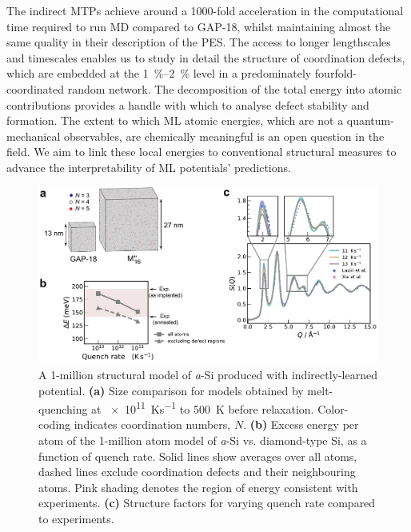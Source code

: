 \documentclass[12pt,a4paper,twoside,nobind]{ociamthesis}
\begin{document}
The indirect MTPs achieve around a 1000-fold acceleration in the computational time required to run MD compared to GAP-18, whilst maintaining almost the same quality in their description of the PES.
The access to longer lengthscales and timescales enables us to study in detail the structure of coordination defects,
which are embedded at the \SIrange{1}{2}{\%} level in a predominately fourfold-coordinated random network. The decomposition of the total energy into atomic contributions provides a handle with which 
to analyse defect stability and formation. The extent to which ML atomic energies, which are not a quantum-mechanical observables, are chemically meaningful is an open question in the field.
We aim to link these local energies to conventional structural measures to advance the interpretability of ML potentials' predictions. 

 \begin{figure}[ht]
  \centering
  \includegraphics[width=\linewidth]{rejig_fig1_tos.pdf}
  \caption{
  A 1-million structural model of \emph{a}-Si produced with indirectly-learned potential. \textbf{(a)} Size comparison for models
  obtained by melt-quenching at \SI{e11}{Ks^{-1}} to \SI{500}{K} before relaxation. Color-coding indicates coordination numbers, $N$. 
  \textbf{(b)} Excess energy per atom of the 1-million atom model of \emph{a}-Si vs. diamond-type Si, as a function of quench rate. Solid lines show averages over all atoms, 
  dashed lines exclude coordination defects and their neighbouring atoms.
  Pink shading denotes the region of energy consistent with experiments.\autocite{Roorda1991}
  \textbf{(c)} Structure factors for varying quench rate compared to experiments.\autocite{Laaziri1999,Xie2013}
  }
  \label{fig:defects1}
\end{figure}
\end{document}
